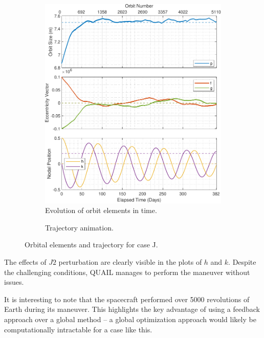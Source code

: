 \begin{figure}[H]
    \centering
    \begin{subfigure}[t]{0.4\textwidth}
        \includegraphics[width=\textwidth]{figures/leo_operations/orbital_elements.pdf}
        \caption{Evolution of orbit elements in time.}
        \label{fig:results_results_j_a}
    \end{subfigure}
    \begin{subfigure}[t]{0.59\textwidth}
        \caption{Trajectory animation.}
        \label{fig:results_results_j_b}
    \end{subfigure}
    \caption{Orbital elements and trajectory for case J.}
    \label{fig:results_results_j}
\end{figure}
The effects of \(J2\) perturbation are clearly visible in the plots of \(h\) and \(k\). Despite the challenging conditions, QUAIL manages to perform the maneuver without issues.

It is interesting to note that the spacecraft performed over 5000 revolutions of Earth during its maneuver. This highlights the key advantage of using a feedback approach over a global method -- a global optimization approach would likely be computationally intractable for a case like this.

